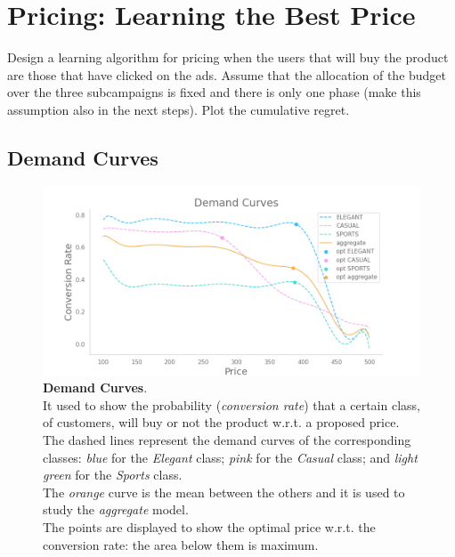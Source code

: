 \chapter{Pricing: Learning the Best Price}

Design a learning algorithm for pricing when the users that will buy the product are those that have clicked on the ads. Assume that the allocation of the budget over the three subcampaigns is fixed and there is only one phase (make this assumption also in the next steps). Plot the cumulative regret.

\section{Demand Curves}

\begin{figure}[hp]
	\centering

	\includegraphics[width=1.0\textwidth]{images/demand_curves.png}
	\caption{\textbf{Demand Curves}.\\
		It used to show the probability (\textit{conversion rate}) that a certain class, of customers, will buy or not the product w.r.t. a proposed price.\\
		The dashed lines represent the demand curves of the corresponding classes:
		\textit{blue} for the \textit{Elegant} class;
		\textit{pink} for the \textit{Casual} class; and
		\textit{light green} for the \textit{Sports} class.\\
		The \textit{orange} curve is the mean between the others and it is used to study the \textit{aggregate} model.\\
		The points are displayed to show the optimal price w.r.t. the conversion rate: the area below them is maximum.}
		\label{demandCurvesFig}
\end{figure}

